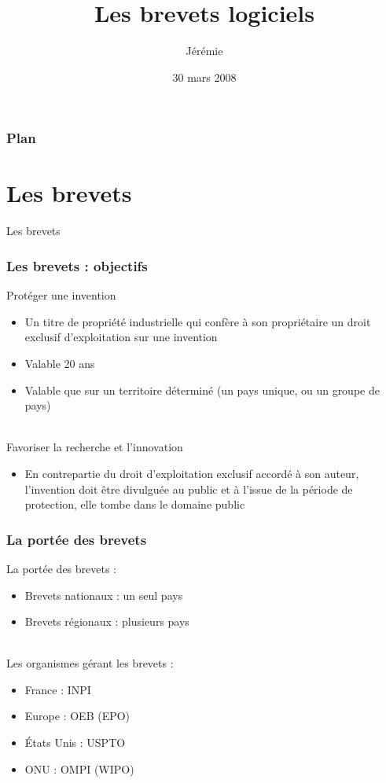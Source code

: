 \documentclass{beamer}
\title{Les brevets logiciels}
\author{Jérémie \bsc{Decock}}
\institute{Université Paris Descartes}
\date{30 mars 2008}
\begin{document}
\begin{frame}
\titlepage
\end{frame}


\begin{frame}
\frametitle{Plan}
\tableofcontents
\end{frame}


\section{Les brevets}
\begin{frame}
\begin{center}
{\LARGE Les brevets}
\end{center}
\end{frame}

\begin{frame}
\frametitle{Les brevets : objectifs}
Protéger une invention
\begin{itemize}
	\item Un titre de propriété industrielle qui confère à son propriétaire un droit exclusif d’exploitation sur une invention
	\item Valable 20 ans
	\item Valable que sur un territoire déterminé (un pays unique, ou un groupe de pays)
\end{itemize}
~\\
Favoriser la recherche et l'innovation
\begin{itemize}
	\item En contrepartie du droit d'exploitation exclusif accordé à son auteur, l'invention doit être divulguée au public et à l'issue de la période de protection, elle tombe dans le domaine public
\end{itemize}
\end{frame}

\begin{frame}
\frametitle{La portée des brevets}
La portée des brevets :
\begin{itemize}
	\item Brevets nationaux : un seul pays
	\item Brevets régionaux : plusieurs pays
\end{itemize}
~\\
Les organismes gérant les brevets :
\begin{itemize}
	\item France : INPI
	\item Europe : OEB (EPO)
	\item États Unis : USPTO
	\item ONU : OMPI (WIPO)
\end{itemize}
\end{frame}
\end{document}
